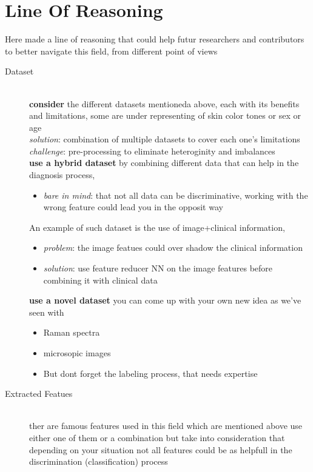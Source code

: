 \section{Line Of Reasoning}
    Here made a line of reasoning that could help futur researchers and contributors to better navigate this field, from different point of views 
    \begin{description}
        \item[Dataset] \hfill \\
            \textbf{consider} the different datasets mentioneda above, each with its benefits and limitations, some are under representing of skin color tones or sex or age \\
            \emph{solution}: combination of multiple datasets to cover each one's limitations \\
            \emph{challenge}: pre-processing to eliminate heteroginity and imbalances \\

            \textbf{use a hybrid dataset} by combining different data that can help in the diagnosis process, \\
            \begin{itemize}
                \item \emph{bare in mind}:  that not all data can be discriminative, working with the wrong feature could lead you in the opposit way 
            \end{itemize}
            An example of such dataset is the use of  image+clinical information, \\
            \begin{itemize}
                \item \emph{problem}: the image featues could over shadow the clinical information \\
                \item \emph{solution}: use feature reducer NN on the image features before combining it with clinical data \\ 
            \end{itemize}
                
            \textbf{use a novel dataset} you can come up with your own new idea as we've seen with
                \begin{itemize}
                    \item Raman spectra
                    \item microsopic images
                    \item But dont forget the labeling process, that needs expertise
                \end{itemize}
        \item[Extracted Featues] \hfill \\ 
            ther are famous features used in this field which are mentioned above use either one of them or a combination but take into consideration that depending on your situation not all features could be as helpfull in the discrimination (classification) process
            

\end{description}
